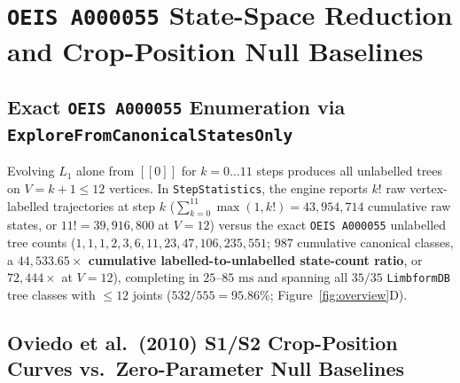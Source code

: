 \documentclass[11pt,a4paper]{article}
\theoremstyle{definition}
\theoremstyle{remark}
\begin{document}
\section{\texttt{OEIS A000055} State-Space Reduction and Crop-Position Null Baselines}

\subsection{Exact \texttt{OEIS A000055} Enumeration via \texttt{ExploreFromCanonicalStatesOnly}}

Evolving $L_1$ alone from $[[0]]$ for $k = 0 \dots 11$ steps produces all unlabelled trees on $V = k + 1 \le 12$ vertices. In \texttt{StepStatistics}, the engine reports $k!$ raw vertex-labelled trajectories at step $k$ ($\sum_{k=0}^{11} \max(1, k!) = 43{,}954{,}714$ cumulative raw states, or $11! = 39{,}916{,}800$ at $V = 12$) versus the exact \texttt{OEIS A000055} unlabelled tree counts ($1, 1, 1, 2, 3, 6, 11, 23, 47, 106, 235, 551$; $987$ cumulative canonical classes, a \textbf{$44{,}533.65\times$ cumulative labelled-to-unlabelled state-count ratio}, or $72{,}444\times$ at $V = 12$), completing in $25\text{--}85\text{ ms}$ and spanning all $35/35$ \texttt{LimbformDB} tree classes with $\le 12$ joints ($532/555 = 95.86\%$; Figure~\ref{fig:overview}D).

\subsection{Oviedo et al.\ (2010) S1/S2 Crop-Position Curves vs.\ Zero-Parameter Null Baselines}
\end{document}
